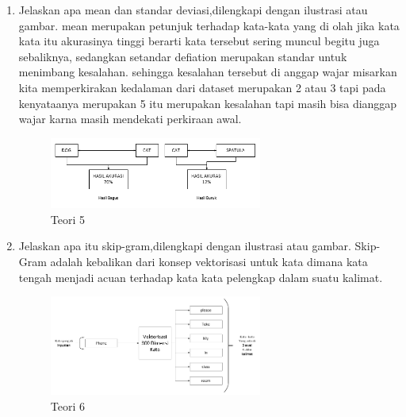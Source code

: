 \begin{enumerate}
	\item Jelaskan apa mean dan standar deviasi,dilengkapi dengan ilustrasi atau gambar.
	\hfill\break
	mean merupakan petunjuk terhadap kata-kata yang di olah jika kata kata itu akurasinya tinggi berarti kata tersebut sering muncul begitu juga sebaliknya, sedangkan setandar defiation merupakan standar untuk menimbang kesalahan. sehingga kesalahan tersebut di anggap wajar misarkan kita memperkirakan kedalaman dari dataset merupakan 2 atau 3 tapi pada kenyataanya merupakan 5 itu merupakan kesalahan tapi masih bisa dianggap wajar karna masih mendekati perkiraan awal.
	\hfill\break
	\begin{figure}[H]
		\includegraphics[width=7cm]{figures/1174087/5/5.png}
		\centering
		\caption{Teori 5}
	\end{figure}

	\item Jelaskan apa itu skip-gram,dilengkapi dengan ilustrasi atau gambar.
	\hfill\break
	Skip-Gram adalah kebalikan dari konsep vektorisasi untuk kata dimana kata tengah menjadi acuan terhadap kata kata pelengkap dalam suatu kalimat.
	\hfill\break
	\begin{figure}[H]
		\includegraphics[width=7cm]{figures/1174087/5/6.png}
		\centering
		\caption{Teori 6}
	\end{figure}
\end{enumerate}
